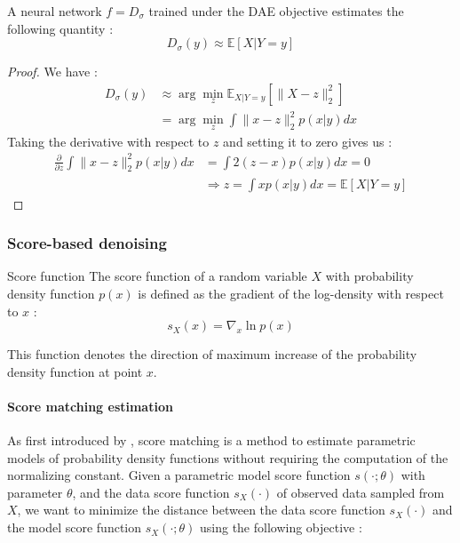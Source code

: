 \begin{proposition}
    A neural network $f = D_{\sigma}$ trained under the DAE objective estimates the following quantity :
    \begin{equation}
        D_{\sigma}(y) \approx \mathbb{E}\left[X | Y = y\right]
    \end{equation}
\end{proposition}

\begin{proof}
    We have :
    \begin{align*}
        D_{\sigma}(y) &\approx \arg \min_z \mathbb{E}_{X|Y=y}\left[\|X - z\|_2^2\right] \\
        &= \arg \min_z \int \|x - z\|_2^2 p(x|y) dx
    \end{align*}
    Taking the derivative with respect to $z$ and setting it to zero gives us :
    \begin{align*}
        \frac{\partial}{\partial z} \int \|x - z\|_2^2 p(x|y) dx &= \int 2(z - x) p(x|y) dx = 0 \\
        &\Rightarrow z = \int x p(x|y) dx = \mathbb{E}[X | Y = y]
    \end{align*}
\end{proof}

\subsubsection{Score-based denoising}


\begin{definition}{Score function}
    The score function of a random variable $X$ with probability density function $p(x)$ is defined as the gradient of the log-density with respect to $x$ :
    \begin{equation}
        s_X(x) = \nabla_x \ln p(x)
    \end{equation}
\end{definition}

This function denotes the direction of maximum increase of the probability density function at point $x$.

\paragraph{Score matching estimation}

As first introduced by \cite{hyvarinen_estimation_2005}, score matching is a method to estimate parametric models of probability density functions without requiring the computation of the normalizing constant.
Given a parametric model score function $s(\cdot; \theta)$ with parameter $\theta$, and the data score function $s_X(\cdot)$ of observed data sampled from $X$, we want to minimize the distance between the data score function $s_X(\cdot)$ and the model score function $s_X(\cdot; \theta)$ using the following objective :

